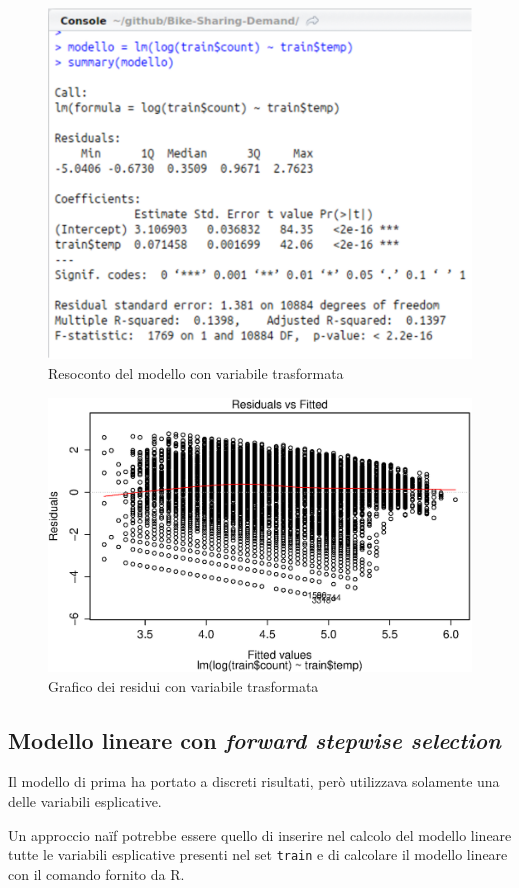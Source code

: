 \begin{figure}[H]
  \centering
  \includegraphics[width=.7\columnwidth]{images/lm/simpl-lm-summary.eps}
  \caption{Resoconto del modello con variabile trasformata}
  \label{fig:simpl-lm-log-summary}
\end{figure}

\begin{figure}[H]
  \centering
  \includegraphics[width=.7\columnwidth]{images/lm/simple-lm-log-residuals.eps}
  \caption{Grafico dei residui con variabile trasformata}
  \label{fig:simpl-lm-log-residuals}
\end{figure}


\subsection{Modello lineare con \emph{forward stepwise selection}}\label{sec:mod-lin-fwd-sw}
Il modello di prima ha portato a discreti risultati, però utilizzava solamente
una delle variabili esplicative.

Un approccio naïf potrebbe essere quello di inserire nel calcolo del modello
lineare tutte le variabili esplicative presenti nel set \texttt{train} e di
calcolare il modello lineare con il comando fornito da R.

